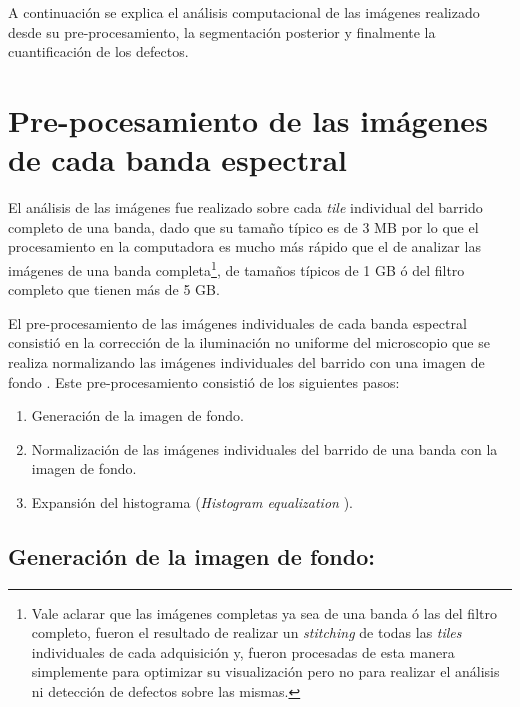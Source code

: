 A continuación se explica el análisis computacional de las imágenes realizado desde su pre-procesamiento, la segmentación posterior y finalmente la cuantificación de los defectos.

\singlespacing
\section{Pre-pocesamiento de las imágenes de cada banda espectral }

\hspace{0.5cm}El análisis de las imágenes fue realizado sobre cada \textit{tile} individual del barrido completo de una banda, dado que su tamaño típico es de 3 MB por lo que el procesamiento en la computadora es mucho más rápido que el de analizar las imágenes de una banda completa\footnote{Vale aclarar que las imágenes completas ya sea de una banda ó las del filtro completo, fueron el resultado de realizar un \textit{stitching} de todas las \textit{tiles} individuales de cada adquisición y, fueron procesadas de esta manera simplemente para optimizar su visualización pero no para realizar el análisis ni detección de defectos sobre las mismas.}, de tamaños típicos de 1 GB ó del filtro completo que tienen más de 5 GB.

El pre-procesamiento de las imágenes individuales de cada banda espectral consistió en la corrección de la iluminación no uniforme del microscopio que se realiza normalizando las imágenes individuales del barrido con una imagen de fondo \cite{Nordenfelt}. Este pre-procesamiento consistió de los siguientes pasos:
\begin{enumerate}
\justifying
\item Generación de la imagen de fondo.
\item Normalización de las imágenes individuales del barrido de una banda con la imagen de fondo.
\item Expansión del histograma (\textit{Histogram equalization} \cite{anilfund}).
\end{enumerate}

\singlespacing
\subsection{Generación de la imagen de fondo: \href{https://github.com/jrr1984/defects_analysis/blob/master/MAIN/bg.py}{\faGithub}}

